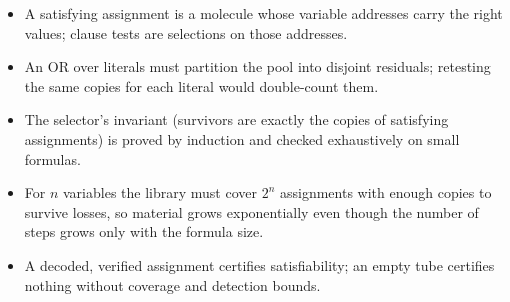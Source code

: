 \begin{KeyIdeas}
\begin{itemize}\setlength{\itemsep}{2pt}
\item A satisfying assignment is a molecule whose variable addresses carry the
right values; clause tests are selections on those addresses.
\item An OR over literals must partition the pool into disjoint residuals;
retesting the same copies for each literal would double-count them.
\item The selector's invariant (survivors are exactly the copies of satisfying
assignments) is proved by induction and checked exhaustively on small formulas.
\item For $n$ variables the library must cover $2^n$ assignments with enough copies
to survive losses, so material grows exponentially even though the number of
steps grows only with the formula size.
\item A decoded, verified assignment certifies satisfiability; an empty tube
certifies nothing without coverage and detection bounds.
\end{itemize}
\end{KeyIdeas}

